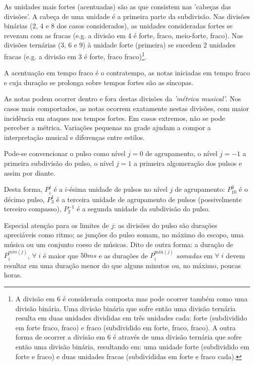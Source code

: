As unidades mais fortes (acentuadas) são as que consistem nas 'cabeças das divisões'. A cabeça de uma unidade é a primeira parte da subdivisão. Nas divisões binárias (2, 4 e 8 dos casos considerados),
as unidades consideradas fortes se revezam com as fracas
(e.g. a divisão em 4 é forte, fraco, meio-forte, fraco).
Nas divisões ternárias (3, 6 e 9)
à unidade forte (primeira) se sucedem 2 unidades fracas (e.g. a divisão em 3 é forte, fraco fraco)\footnote{A divisão em 6 é considerada composta
 mas pode ocorrer também como uma divisão binária.
 Uma divisão binária que sofre então uma divisão ternária
 resulta em duas unidades divididas em três unidades cada: forte (subdividido em forte fraco, fraco) e fraco (subdividido em forte, fraco, fraco).
A outra forma de ocorrer a divisão em 6 é através de 
uma divisão ternária que sofre então uma divisão binária, resultando em:
uma unidade forte (subdividido em forte e fraco) e duas unidades fracas (subdivididas em forte e fraco cada).}.

A acentuação em tempo fraco é o contratempo, as notas iniciadas em tempo fraco e cuja duração se prolonga sobre tempos fortes são as síncopas.

As notas podem ocorrer dentro e fora destas divisões da \emph{'métrica musical'}. Nos casos mais comportados, as notas ocorrem exatamente nestas divisões, com maior incidência em ataques nos tempos fortes.
Em casos extremos, não se pode perceber a métrica.\cite{Roederer} Variações pequenas na grade ajudam a compor a interpretação musical e diferenças entre estilos.\cite{Cook}

Pode-se convencionar
o pulso como nível $j=0$ de agrupamento, o nível $j=-1$ 
a primeira subdivisão do pulso, o nível $j=1$ a primeira algomeração dos pulsos e assim por diante. 

Desta forma, $P_i^j$ é a $i$-ésima unidade de 
pulsos no nível $j$ de agrupamento:
$P^0_{10}$ é o décimo pulso, $P^{1}_3$ é a terceira unidade de agrupamento de pulsos (possivelmente terceiro compasso),
$P^{-1}_2$ é a segunda unidade da subdivisão do pulso.

Especial atenção para
os limites de $j$: as divisões do pulso são durações apreciáveis
como ritmo; as junções do pulso somam, no máximo
do escopo, uma música ou um conjunto coeso de músicas. Dito de outra forma: a duração de $P^{min(j)}_i$, $\forall \; i$
é maior que $50ms$ e as durações de $P^{\text{máx}(j)}_i$ \emph{somadas}  em $\forall \; i$
devem resultar em uma duração menor do que alguns minutos ou, no máximo, poucas horas.


